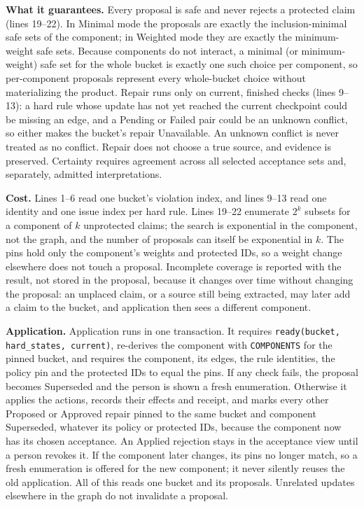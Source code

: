 \documentclass[11pt]{article}
\newcommand{\code}[1]{\texttt{#1}}
\begin{document}
\textbf{What it guarantees.} Every proposal is safe and never rejects a
protected claim (lines 19--22). In Minimal mode the proposals are exactly the
inclusion-minimal safe sets of the component; in Weighted mode they are exactly
the minimum-weight safe sets. Because components do not interact, a minimal (or
minimum-weight) safe set for the whole bucket is exactly one such choice per
component, so per-component proposals represent every whole-bucket choice
without materializing the product. Repair runs only on current, finished
checks (lines 9--13): a hard rule whose update has not yet reached the current
checkpoint could be missing an edge, and a Pending or Failed pair could be an
unknown conflict, so either makes the bucket's repair Unavailable. An unknown
conflict is never treated as no conflict. Repair does not choose a true source,
and evidence is preserved. Certainty requires agreement across all selected
acceptance sets and, separately, admitted interpretations.

\textbf{Cost.} Lines 1--6 read one bucket's violation index, and lines 9--13
read one identity and one issue index per hard rule. Lines 19--22 enumerate $2^{k}$ subsets for a
component of $k$ unprotected claims; the search is exponential in the
component, not the graph, and the number of proposals can itself be
exponential in $k$. The pins hold only the component's weights and protected
IDs, so a weight change elsewhere does not touch a proposal. Incomplete coverage
is reported with the result, not stored in the proposal, because it changes
over time without changing the proposal: an unplaced claim, or a source still
being extracted, may later add a claim to the bucket, and application then
sees a different component.

\textbf{Application.} Application runs in one transaction. It requires
\code{ready(bucket, hard\_states, current)}, re-derives the component with
\code{COMPONENTS} for the pinned bucket, and requires the component, its edges,
the rule identities, the policy pin and the protected IDs to equal the pins.
If any check fails, the proposal becomes Superseded and the person is shown a
fresh enumeration. Otherwise it applies the actions, records their effects and
receipt, and marks every other Proposed or Approved repair pinned to the same
bucket and component Superseded, whatever its policy or protected IDs, because
the component now has its chosen acceptance. An Applied rejection stays in the
acceptance view until a person revokes it. If the component later changes, its
pins no longer match, so a fresh enumeration is offered for the new component;
it never silently reuses the old application. All of this
reads one bucket and its proposals. Unrelated updates elsewhere in the graph
do not invalidate a proposal.
\end{document}
